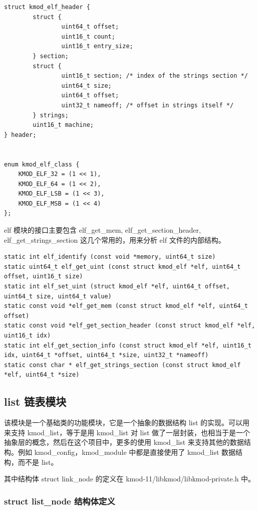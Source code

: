 {\begin{shaded}\begin{verbatim}
struct kmod_elf_header {
        struct {
                uint64_t offset;
                uint16_t count;
                uint16_t entry_size;
        } section;
        struct {
                uint16_t section; /* index of the strings section */
                uint64_t size;
                uint64_t offset;
                uint32_t nameoff; /* offset in strings itself */
        } strings;
        uint16_t machine;
} header;


enum kmod_elf_class {
    KMOD_ELF_32 = (1 << 1),
    KMOD_ELF_64 = (1 << 2),
    KMOD_ELF_LSB = (1 << 3),
    KMOD_ELF_MSB = (1 << 4)
};
\end{verbatim}\end{shaded}}
elf 模块的接口主要包含 elf\_get\_mem, elf\_get\_section\_header,
elf\_get\_strings\_section 这几个常用的，用来分析 elf 文件的内部结构。

{\begin{shaded}\begin{verbatim}
static int elf_identify (const void *memory, uint64_t size)
static uint64_t elf_get_uint (const struct kmod_elf *elf, uint64_t offset, uint16_t size)
static int elf_set_uint (struct kmod_elf *elf, uint64_t offset, uint64_t size, uint64_t value)
static const void *elf_get_mem (const struct kmod_elf *elf, uint64_t offset)
static const void *elf_get_section_header (const struct kmod_elf *elf, uint16_t idx)
static int elf_get_section_info (const struct kmod_elf *elf, uint16_t idx, uint64_t *offset, uint64_t *size, uint32_t *nameoff)
static const char * elf_get_strings_section (const struct kmod_elf *elf, uint64_t *size)
\end{verbatim}\end{shaded}}
\subsection{list 链表模块}

该模块是一个基础类的功能模块，它是一个抽象的数据结构 list
的实现。可以用来支持 kmod\_list，等于是用 kmod\_list 对 list
做了一层封装，也相当于是一个抽象层的概念，然后在这个项目中，更多的使用
kmod\_list 来支持其他的数据结构。例如 kmod\_config，kmod\_module
中都是直接使用了 kmod\_list 数据结构，而不是 list。

其中结构体 struct link\_node 的定义在 kmod-11/libkmod/libkmod-private.h
中。

\subsubsection{struct list\_node 结构体定义}


